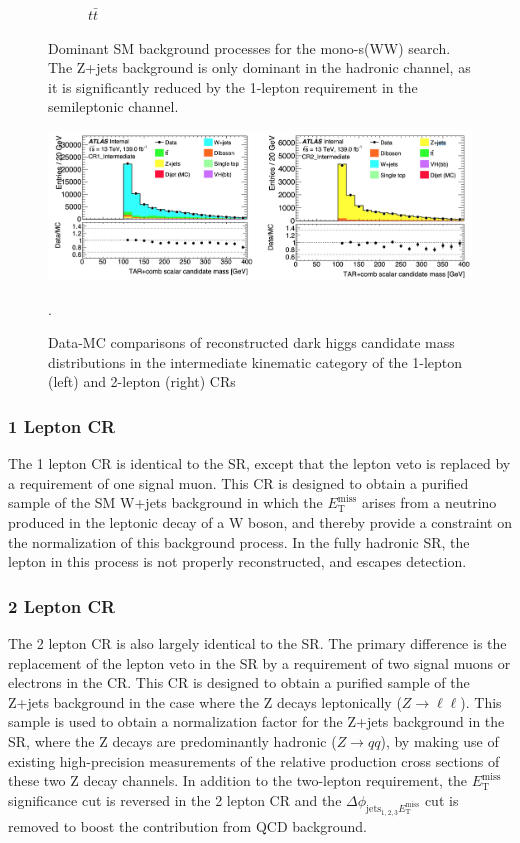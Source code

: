 \documentclass[12pt]{article}
\newcommand*{\met}{\ensuremath{E_\text{T}^\text{miss}} }
\newcommand*{\mindphi}{\ensuremath{\Delta \phi_{\text{jets}_{1,2,3} \met}} }
\begin{document}
\begin{figure}[H]
\begin{subfigure}[b]{0.4\textwidth}
         \caption[]{$t\bar{t}$}
         \label{fig:ttbar}
     \end{subfigure}
\caption[]{Dominant SM background processes for the mono-s(WW) search. The Z+jets background is only dominant in the hadronic channel, as it is significantly reduced by the 1-lepton requirement in the semileptonic channel.}
\label{fig:dom_bkgs}
\end{figure}

\begin{figure}[H]
	\centering
	\includegraphics[width=\textwidth]{figures/had_Intermediate_DataMC.png}
	\caption[]{Data-MC comparisons of reconstructed dark higgs candidate mass distributions in the intermediate kinematic category of the 1-lepton (left) and 2-lepton (right) CRs}.
	\label{fig:had_Intermediate_DataMC} 
\end{figure}

\subsubsection{1 Lepton CR}

The 1 lepton CR is identical to the SR, except that the lepton veto is replaced by a requirement of one signal muon. This CR is designed to obtain a purified sample of the SM W+jets background in which the \met arises from a neutrino produced in the leptonic decay of a W boson, and thereby provide a constraint on the normalization of this background process. In the fully hadronic SR, the lepton in this process is not properly reconstructed, and escapes detection. 

\subsubsection{2 Lepton CR}

The 2 lepton CR is also largely identical to the SR. The primary difference is the replacement of the lepton veto in the SR by a requirement of two signal muons or electrons in the CR. This CR is designed to obtain a purified sample of the Z+jets background in the case where the Z decays leptonically ($Z\rightarrow\ell\ell$). This sample is used to obtain a normalization factor for the Z+jets background in the SR, where the Z decays are predominantly hadronic ($Z\rightarrow qq$), by making use of existing high-precision measurements of the relative production cross sections of these two Z decay channels. In addition to the two-lepton requirement, the \met significance cut is reversed in the 2 lepton CR and the \mindphi cut is removed to boost the contribution from QCD background. 
\end{document}
